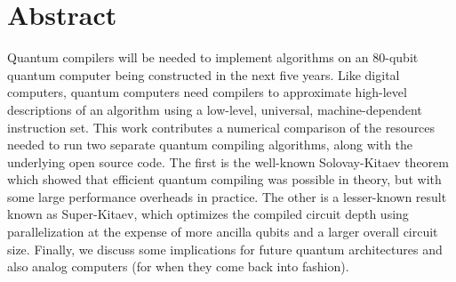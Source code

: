 \section{Abstract}

Quantum compilers will be needed to implement algorithms on an
80-qubit quantum computer being constructed in the next five years.
Like digital computers, quantum
computers need compilers to approximate high-level descriptions of
an algorithm using a low-level, universal, machine-dependent
instruction set. This work contributes
a numerical comparison of the
resources needed to run two separate quantum compiling algorithms, along
with the underlying open source code.
The first is the well-known Solovay-Kitaev theorem which showed that
efficient quantum compiling was possible in theory, but with some large
performance overheads in practice. The other is a
lesser-known result known as Super-Kitaev, which optimizes the compiled
circuit depth using parallelization at the expense of more ancilla qubits
and a larger overall circuit size. Finally, we discuss some implications for
future quantum architectures and also analog computers
(for when they come back into
fashion).
